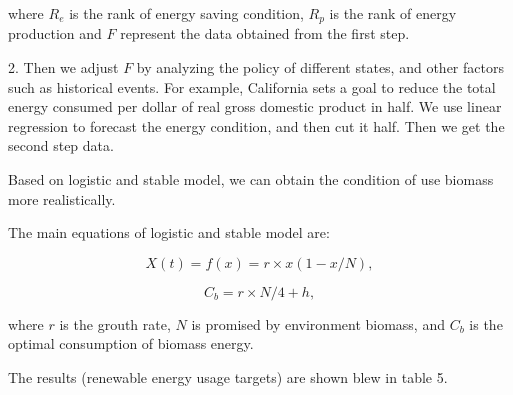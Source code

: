 \documentclass{mcmthesis}
\begin{document}
where $R_e$ is the rank of energy saving condition, $R_p$ is the rank of energy production and $F$ represent the data obtained from the first step.

2. Then we adjust $F$ by analyzing the policy of different states, and other factors such as historical events. For example, California sets a goal to reduce the total energy consumed per dollar of real gross domestic product in half. We use linear regression to forecast the energy condition, and then cut it half. Then we get the second step data.

Based on logistic and stable model, we can obtain the condition of use biomass more realistically.

The main equations of logistic and stable model are:

\begin{equation}
 X(t)=f(x)=r\times x(1-x/N),
\end{equation}

\begin{equation}
C_b=r\times N/4+h,
\end{equation}

where $r$ is  the grouth rate, $N$ is promised by environment biomass, and $C_b$ is the optimal consumption of biomass energy.

The results (renewable energy usage targets) are shown blew in table 5.
\end{document}
